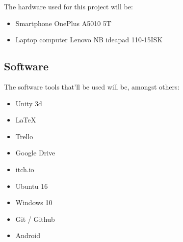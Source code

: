 The hardware used for this project will be:

\begin{itemize}
    \item Smartphone OnePlus A5010 5T 
    \item Laptop computer Lenovo NB ideapad 110-15ISK
\end{itemize}

\subsection{Software}

The software tools that'll be used will be, amongst others:

\begin{itemize}
    \item Unity 3d
    \item LaTeX
    \item Trello
    \item Google Drive
    \item itch.io
    \item Ubuntu 16
    \item Windows 10
    \item Git / Github
    \item Android
\end{itemize}

